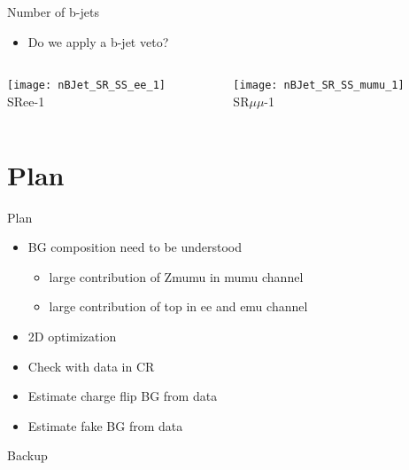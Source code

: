 \documentclass[mathserif,serif]{beamer}
\begin{document}
\begin{frame}{Number of b-jets}
\begin{itemize}
\item Do we apply a b-jet veto?
\end{itemize}

\begin{columns}

\begin{column}{0.5\textwidth}
\begin{center}
\texttt{[image: nBJet\_SR\_SS\_ee\_1]} \\
SRee-1
\end{center}
\end{column}

\begin{column}{0.5\textwidth}
\begin{center}
\texttt{[image: nBJet\_SR\_SS\_mumu\_1]} \\
SR$\mu\mu$-1
\end{center}
\end{column}

\end{columns}

\end{frame}

\section{Plan}
\begin{frame}{Plan}
\begin{itemize}
\item BG composition need to be understood
\begin{itemize}
\item large contribution of Zmumu in mumu channel
\item large contribution of top in ee and emu channel
\end{itemize}
\item 2D optimization
\item Check with data in CR
\item Estimate charge flip BG from data
\item Estimate fake BG from data
\end{itemize}
\end{frame}

\begin{frame}
\begin{center}
\huge
Backup
\end{center}
\end{frame}
\end{document}
